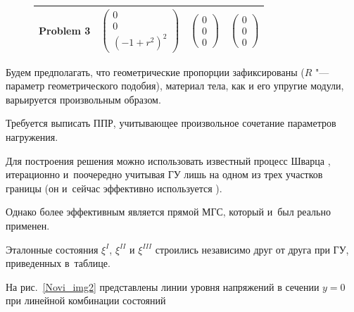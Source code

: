 \begin{figure}[b!]
\begin{tabular}{|c|c|c|c|}
Problem 3 &\rule{0mm}{24pt}$\left(\begin{array}{c} {0} \\ {0} \\ {(-1+r^{2} )^{2} } \end{array}\right)$ & $\left(\begin{array}{c} {0} \\ {0} \\ {0} \end{array}\right)$ & $\left(\begin{array}{c} {0} \\ {0} \\ {0} \end{array}\right)$ \\ 

\hline 

\end{tabular} 









\end{figure}













Будем предполагать, что геометрические пропорции зафиксированы ($R$ "--- параметр геометрического подобия), материал тела, как и его упругие модули, варьируется произвольным образом. 

Требуется выписать ППР, учитывающее произвольное сочетание параметров нагружения.



Для построения решения можно использовать известный процесс Шварца \cite{Novi_bib9}, итерационно и~поочередно учитывая ГУ лишь на одном из трех участков границы (он и~сейчас эффективно используется \cite{Novi_bib10}). 

Однако более эффективным является прямой МГС, который и~был реально применен. 



Эталонные состояния ${{\xi }^{I}}$, ${{\xi }^{II}}$ и ${{\xi }^{III}}$  строились независимо друг от друга при ГУ, приведенных  в~таблице.



На рис.~\ref{Novi_img2} представлены линии уровня напряжений в сечении $y=0$ при линейной комбинации состояний 

